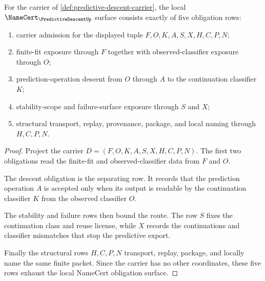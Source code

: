 \begin{theorem}
\label{thm:predictive-descent-namecert-obligations}
For the carrier of \autoref{def:predictive-descent-carrier}, the local $\NameCert_{\PredictiveDescentUp}$ surface consists exactly of five obligation rows:
\begin{enumerate}
\item carrier admission for the displayed tuple $F,O,K,A,S,X,H,C,P,N$;
\item finite-fit exposure through $F$ together with observed-classifier exposure through $O$;
\item prediction-operation descent from $O$ through $A$ to the continuation classifier $K$;
\item stability-scope and failure-surface exposure through $S$ and $X$;
\item structural transport, replay, provenance, package, and local naming through $H,C,P,N$.
\end{enumerate}
\end{theorem}
\begin{proof}
Project the carrier $D=(F,O,K,A,S,X,H,C,P,N)$. The first two obligations read the finite-fit and observed-classifier data from $F$ and $O$.

The descent obligation is the separating row. It records that the prediction operation $A$ is accepted only when its output is readable by the continuation classifier $K$ from the observed classifier $O$.

The stability and failure rows then bound the route. The row $S$ fixes the continuation class and reuse license, while $X$ records the continuations and classifier mismatches that stop the predictive export.

Finally the structural rows $H,C,P,N$ transport, replay, package, and locally name the same finite packet. Since the carrier has no other coordinates, these five rows exhaust the local NameCert obligation surface.
\end{proof}

